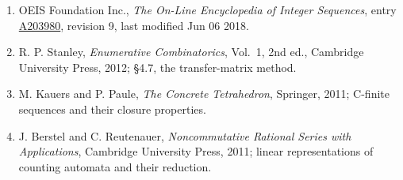 \documentclass[11pt]{article}
\theoremstyle{definition}
\begin{document}
\begin{enumerate}

\item OEIS Foundation Inc., \emph{The On-Line Encyclopedia of Integer Sequences}, entry \href{https://oeis.org/A203980}{A203980}, revision 9, last modified Jun 06 2018.

\item R. P. Stanley, \emph{Enumerative Combinatorics}, Vol.~1, 2nd ed., Cambridge University Press, 2012; \S4.7, the transfer-matrix method.

\item M. Kauers and P. Paule, \emph{The Concrete Tetrahedron}, Springer, 2011; C-finite sequences and their closure properties.

\item J. Berstel and C. Reutenauer, \emph{Noncommutative Rational Series with Applications}, Cambridge University Press, 2011; linear representations of counting automata and their reduction.

\end{enumerate}
\end{document}
